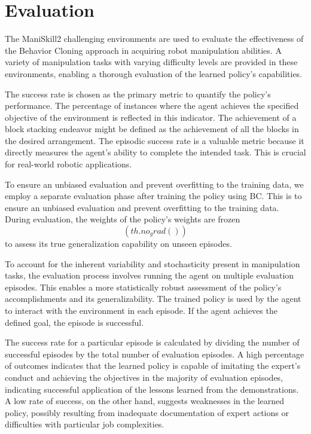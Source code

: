 \documentclass[../report.tex]{subfiles}
\begin{document}
    \section{Evaluation}
    \label{sec:evaluation}

    The ManiSkill2 challenging environments are used to evaluate the effectiveness of the Behavior Cloning approach in acquiring robot manipulation abilities\cite{OpenAI(2022)}. A variety of manipulation tasks with varying difficulty levels are provided in these environments, enabling a thorough evaluation of the learned policy's capabilities.

    The success rate is chosen as the primary metric to quantify the policy's performance. The percentage of instances where the agent achieves the specified objective of the environment is reflected in this indicator. The achievement of a block stacking endeavor might be defined as the achievement of all the blocks in the desired arrangement. The episodic success rate is a valuable metric because it directly measures the agent's ability to complete the intended task. This is crucial for real-world robotic applications.

    To ensure an unbiased evaluation and prevent overfitting to the training data, we employ a separate evaluation phase after training the policy using BC. This is to ensure an unbiased evaluation and prevent overfitting to the training data. During evaluation, the weights of the policy's weights are frozen $$(th.no_grad())$$  to assess its true generalization capability on unseen episodes.

    To account for the inherent variability and stochasticity present in manipulation tasks, the evaluation process involves running the agent on multiple evaluation episodes. This enables a more statistically robust assessment of the policy's accomplishments and its generalizability. The trained policy is used by the agent to interact with the environment in each episode. If the agent achieves the defined goal, the episode is successful.
    
    The success rate for a particular episode is calculated by dividing the number of successful episodes by the total number of evaluation episodes. A high percentage of outcomes indicates that the learned policy is capable of imitating the expert's conduct and achieving the objectives in the majority of evaluation episodes, indicating successful application of the lessons learned from the demonstrations. A low rate of success, on the other hand, suggests weaknesses in the learned policy, possibly resulting from inadequate documentation of expert actions or difficulties with particular job complexities.
\end{document}

